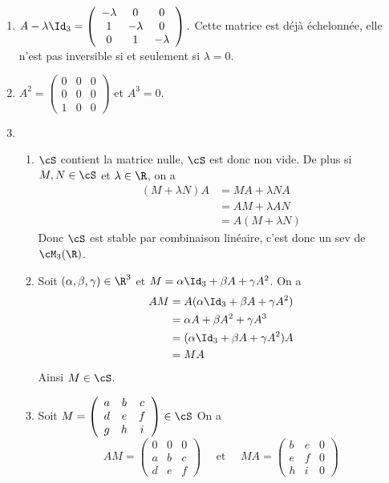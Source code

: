 \begin{correction}
\begin{enumerate}
\item $A-\lambda \Id_3 =\left(\begin{array}{ccc}
-\lambda&0&0\\
1&-\lambda&0\\
0&1&-\lambda
\end{array}
\right).$ Cette matrice est déjà échelonnée, elle n'est pas  inversible si et seulement si $\lambda =0$.
\item $A^2=\left(\begin{array}{ccc}
0&0&0\\
0&0&0\\
1&0&0
\end{array}
\right)$  et  $A^3 =0$.
\item 
\begin{enumerate}
\item $\cS$ contient la matrice nulle, $\cS$ est donc non vide. 
De plus si $M,N \in \cS$ et $\lambda \in \R$, on a 
\begin{align*}
(M +\lambda N) A &= M A + \lambda NA \\
							&= AM +\lambda AN\\
							&= A (M +\lambda N) 
\end{align*}
Donc $\cS$ est stable par combinaison linéaire, c'est donc un sev de $\cM_3(\R)$. 
\item Soit $(\alpha, \beta, \gamma )\in \R^3$  et $M = \alpha \Id_3 +\beta A +\gamma A^2$. On  a
\begin{align*}
AM &= A (  \alpha \Id_3 +\beta A +\gamma A^2 )\\
	&= \alpha A +\beta A^2 +\gamma A^3 \\
	&= (  \alpha \Id_3 +\beta A +\gamma A^2 ) A \\
	&=MA
\end{align*}
Ainsi $M\in \cS$. 

\item Soit $M =   \left(\begin{array}{ccc}
a&b&c\\
d&e&f\\
g&h&i
\end{array}
\right) \in \cS$ On a 
$$AM = \left(\begin{array}{ccc}
0&0&0\\
a&b&c\\
d&e&f
\end{array} \right)  \quad \text{ et } \quad MA = \left(\begin{array}{ccc}
b&e&0\\
e&f&0\\
h&i&0
\end{array}  \right) $$ 


\end{enumerate}
\end{enumerate}
\end{correction}
